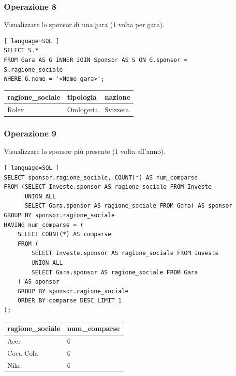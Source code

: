 \documentclass[11pt]{article}
\begin{document}
\subsubsection{Operazione 8}
Visualizzare lo sponsor di una gara (1 volta per gara).
\begin{lstlisting}[ language=SQL ]
SELECT S.*
FROM Gara AS G INNER JOIN Sponsor AS S ON G.sponsor = S.ragione_sociale
WHERE G.nome = '<Nome gara>';
\end{lstlisting}

\begin{table}[!ht]
    \centering
    \begin{tabular}{|l|l|l|}
    \hline
        \textbf{ragione\_sociale} & \textbf{tipologia} & \textbf{nazione} \\ \hline
        Rolex & Orologeria & Svizzera \\ \hline
    \end{tabular}
\end{table}


\subsubsection{Operazione 9}
Visualizzare lo sponsor più presente (1 volta all'anno).
\begin{lstlisting}[ language=SQL ]
SELECT sponsor.ragione_sociale, COUNT(*) AS num_comparse
FROM (SELECT Investe.sponsor AS ragione_sociale FROM Investe 
      UNION ALL 
      SELECT Gara.sponsor AS ragione_sociale FROM Gara) AS sponsor
GROUP BY sponsor.ragione_sociale
HAVING num_comparse = (
    SELECT COUNT(*) AS comparse
    FROM (
        SELECT Investe.sponsor AS ragione_sociale FROM Investe 
        UNION ALL 
        SELECT Gara.sponsor AS ragione_sociale FROM Gara
    ) AS sponsor
    GROUP BY sponsor.ragione_sociale
    ORDER BY comparse DESC LIMIT 1
);
\end{lstlisting}

\begin{table}[!ht]
    \centering
    \begin{tabular}{|l|l|}
    \hline
        \textbf{ragione\_sociale} & \textbf{num\_comparse} \\ \hline
        Acer & 6 \\ \hline
        Coca Cola & 6 \\ \hline
        Nike & 6 \\ \hline
    \end{tabular}
\end{table}
\end{document}
